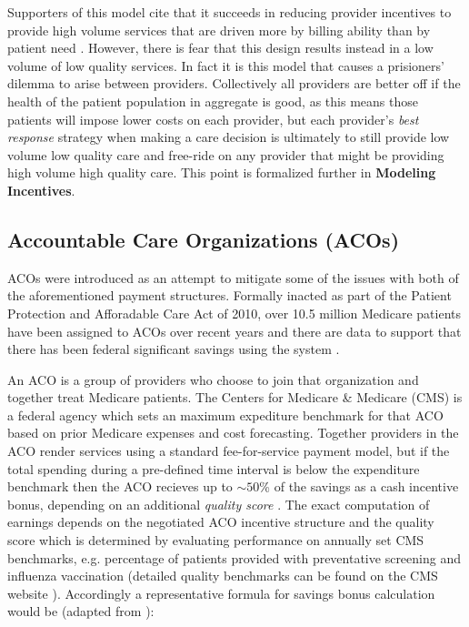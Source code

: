 \documentclass{article}
\begin{document}
Supporters of this model cite that it succeeds in reducing provider incentives to provide high volume services that are driven more by billing ability than by patient need \cite{blended}. However, there is fear that this design results instead in a low volume of low quality services. In fact it is this model that causes a prisioners' dilemma to arise between providers. Collectively all providers are better off if the health of the patient population in aggregate is good, as this means those patients will impose lower costs on each provider, but each provider's \emph{best response} strategy when making a care decision is ultimately to still provide low volume low quality care and free-ride on any provider that might be providing high volume high quality care. This point is formalized further in \textbf{Modeling Incentives}.

\subsection*{Accountable Care Organizations (ACOs)}
ACOs were introduced as an attempt to mitigate some of the issues with both of the aforementioned payment structures. Formally inacted as part of the Patient Protection and Afforadable Care Act of 2010, over 10.5 million Medicare patients have been assigned to ACOs over recent years and there are data to support that there has been federal significant savings using the system \cite{acos}.

An ACO is a group of providers who choose to join that organization and together treat Medicare patients. The Centers for Medicare \& Medicare (CMS) is a federal agency which sets an maximum expediture benchmark for that ACO based on prior Medicare expenses and cost forecasting. Together providers in the ACO render services using a standard fee-for-service payment model, but if the total spending during a pre-defined time interval is below the expenditure benchmark then the ACO recieves up to ${\sim}50$\% of the savings as a cash incentive bonus, depending on an additional \emph{quality score} \cite{acos}. The exact computation of earnings depends on the negotiated ACO incentive structure and the quality score which is determined by evaluating performance on annually set CMS benchmarks, e.g. percentage of patients provided with preventative screening and influenza vaccination (detailed quality benchmarks can be found on the CMS website \cite{cms}). Accordingly a representative formula for savings bonus calculation would be (adapted from \cite{acos}):
\end{document}
